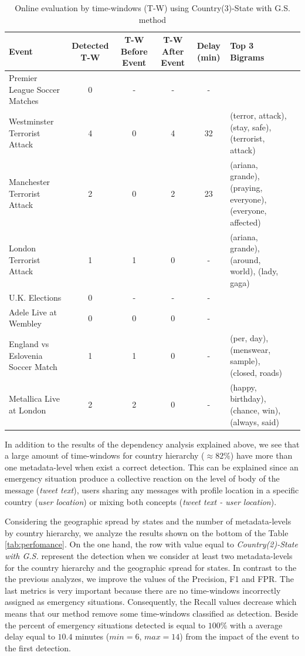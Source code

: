 \documentclass[sigconf]{acmart}
\begin{document}
\begin{table}
	\caption{Online evaluation by time-windows (T-W) using Country(3)-State with G.S. method}
	\label{tab:online2}
	\begin{tabular}{lccccp{3.5cm}c}
		\toprule
		Event &Detected T-W & T-W Before Event & T-W After Event & Delay (min) & Top 3 Bigrams\\
		\midrule
		Premier League Soccer Matches & 0& - & - & - & \hfill \break \\
		Westminster Terrorist Attack& 4 & 0 &4 & 32& \small{(terror, attack), (stay, safe), (terrorist, attack)}\\
		Manchester Terrorist Attack& 2& 0& 2& 23& \small{(ariana, grande), (praying, everyone), (everyone, affected)}\\
		London Terrorist Attack & 1 & 1 & 0 & - & \small{(ariana, grande), (around, world), (lady, gaga)} \\
		U.K. Elections& 0 & - & - & - & \hfill \break\\
		Adele Live at Wembley& 0& 0&0&-& \hfill \break\\
		England vs Eslovenia Soccer Match & 1& 1 & 0 & - & \small{(per, day), (menswear, sample), (closed, roads)}\\
		Metallica Live at London& 2 & 2 & 0 & - & \small{(happy, birthday), (chance, win), (always, said)}\\
		\bottomrule
	\end{tabular}
\end{table}
In addition to the results of the dependency analysis explained above, we see that a large amount of time-windows for country hierarchy ($\approx 82\%$) have more than one metadata-level when exist a correct detection. This can be explained since an emergency situation produce a collective reaction on the level of body of the message (\textit{tweet text}), users sharing any messages with profile location in a specific country (\textit{user location}) or mixing both concepts (\textit{tweet text - user location}).


Considering the geographic spread by states and the number of metadata-levels by country hierarchy, we analyze the results shown on the bottom of the Table \ref{tab:perfomance}. On the one hand, the row with value equal to \textit{Country(2)-State with G.S.} represent the detection when we consider at least two metadata-levels for the country hierarchy and the geographic spread for states. In contrast to the the previous analyzes, we improve the values of the Precision, F1 and FPR. The last metrics is very important because there are no time-windows incorrectly assigned as emergency situations. Consequently, the Recall values decrease which means that our method remove some time-windows classified as detection. Beside the percent of emergency situations detected is equal to $100\%$ with a average delay equal to $10.4$ minutes ($min=6$, $max=14$) from the impact of the event to the first detection.
\end{document}
